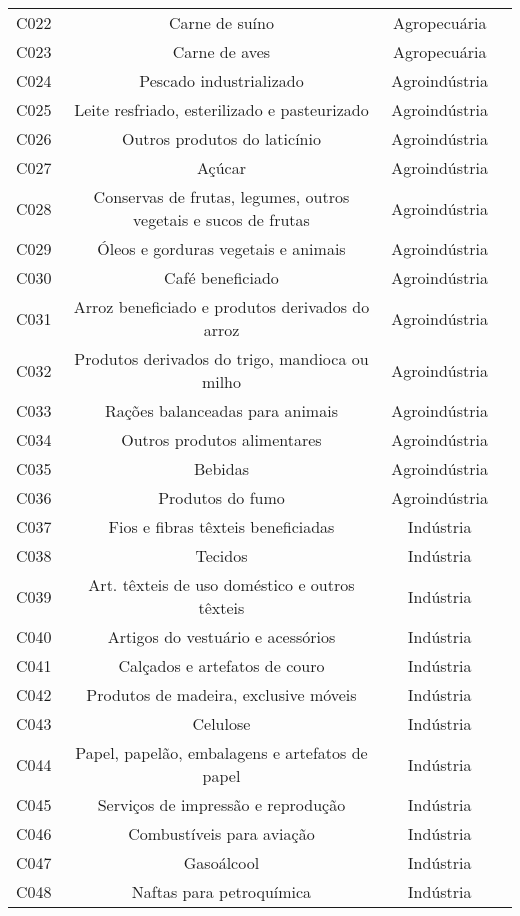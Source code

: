 \begin{apendicesenv}
\begin{small}
\begin{center}
\begin{longtable}{lccc}
				C022 & Carne de suíno & Agropecuária \\
				C023 & Carne de aves & Agropecuária \\
				C024 & Pescado industrializado & Agroindústria \\
				C025 & Leite resfriado, esterilizado e pasteurizado & Agroindústria \\
				C026 & Outros produtos do laticínio & Agroindústria \\
				C027 & Açúcar & Agroindústria \\
				C028 & Conservas de frutas, legumes, outros vegetais e sucos de frutas & Agroindústria \\
				C029 & Óleos e gorduras vegetais e animais & Agroindústria \\
				C030 & Café beneficiado & Agroindústria \\
				C031 & Arroz beneficiado e produtos derivados do arroz & Agroindústria \\
				C032 & Produtos derivados do trigo, mandioca ou milho & Agroindústria \\
				C033 & Rações balanceadas para animais & Agroindústria \\
				C034 & Outros produtos alimentares & Agroindústria \\
				C035 & Bebidas & Agroindústria \\
				C036 & Produtos do fumo & Agroindústria \\
				C037 & Fios e fibras têxteis beneficiadas & Indústria \\
				C038 & Tecidos & Indústria \\
				C039 & Art. têxteis de uso doméstico e outros têxteis & Indústria \\
				C040 & Artigos do vestuário e acessórios & Indústria \\
				C041 & Calçados e artefatos de couro & Indústria \\
				C042 & Produtos de madeira, exclusive móveis & Indústria \\
				C043 & Celulose & Indústria \\
				C044 & Papel, papelão, embalagens e artefatos de papel & Indústria \\
				C045 & Serviços de impressão e reprodução & Indústria \\
				C046 & Combustíveis para aviação & Indústria \\
				C047 & Gasoálcool & Indústria \\
				C048 & Naftas para petroquímica & Indústria \\

\end{longtable}
\end{center}
\end{small}
\end{apendicesenv}
